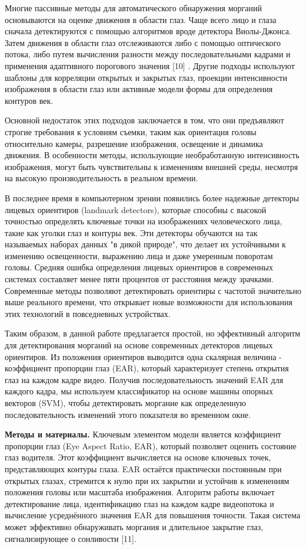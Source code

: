 \documentclass[
]{article}
\begin{document}
Многие пассивные методы для автоматического обнаружения морганий
основываются на оценке движения в области глаз. Чаще всего лицо и глаза
сначала детектируются с помощью алгоритмов вроде детектора Виолы-Джонса.
Затем движения в области глаз отслеживаются либо с помощью оптического
потока, либо путем вычисления разности между последовательными кадрами и
применения адаптивного порогового значения {[}10{]} . Другие подходы
используют шаблоны для корреляции открытых и закрытых глаз, проекции
интенсивности изображения в области глаз или активные модели формы для
определения контуров век.

Основной недостаток этих подходов заключается в том, что они предъявляют
строгие требования к условиям съемки, таким как ориентация головы
относительно камеры, разрешение изображения, освещение и динамика
движения. В особенности методы, использующие необработанную
интенсивность изображения, могут быть чувствительны к изменениям внешней
среды, несмотря на высокую производительность в реальном времени.

В последнее время в компьютерном зрении появились более надежные
детекторы лицевых ориентиров (landmark detectors), которые способны с
высокой точностью определять ключевые точки на изображениях
человеческого лица, такие как уголки глаз и контуры век. Эти детекторы
обучаются на так называемых наборах данных "в дикой природе", что делает
их устойчивыми к изменению освещенности, выражению лица и даже умеренным
поворотам головы. Средняя ошибка определения лицевых ориентиров в
современных системах составляет менее пяти процентов от расстояния между
зрачками. Современные методы позволяют детектировать ориентиры с
частотой значительно выше реального времени, что открывает новые
возможности для использования этих технологий в повседневных
устройствах.

Таким образом, в данной работе предлагается простой, но эффективный
алгоритм для детектирования морганий на основе современных детекторов
лицевых ориентиров. Из положения ориентиров выводится одна скалярная
величина - коэффициент пропорции глаз (EAR), который характеризует
степень открытия глаз на каждом кадре видео. Получив последовательность
значений EAR для каждого кадра, мы используем классификатор на основе
машины опорных векторов (SVM), чтобы детектировать моргание как
определенную последовательность изменений этого показателя во временном
окне.

\textbf{Методы и материалы.} Ключевым элементом модели является
коэффициент пропорции глаз (Eye Aspect Ratio, EAR), который позволяет
оценить состояние глаз водителя. Этот коэффициент вычисляется на основе
ключевых точек, представляющих контуры глаза. EAR остаётся практически
постоянным при открытых глазах, стремится к нулю при их закрытии и
устойчив к изменениям положения головы или масштаба изображения.
Алгоритм работы включает детектирование лица, идентификацию глаз на
каждом кадре видеопотока и вычисление усреднённого значения EAR для
повышения точности. Такая система может эффективно обнаруживать моргания
и длительное закрытие глаз, сигнализирующее о сонливости {[}11{]}.
\end{document}
